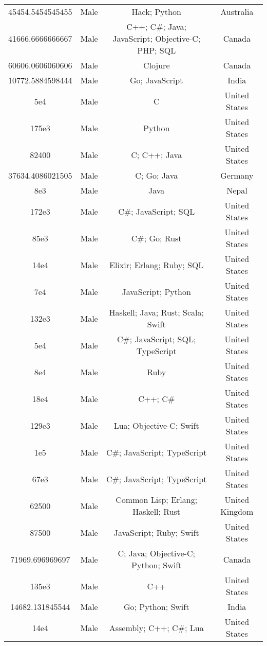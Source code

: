 \begin{center}
\begin{tabular}{ |c|c|c|c| }
45454.5454545455  &  Male  &  Hack; Python  &  Australia  \\ 
41666.6666666667  &  Male  &  C++; C\#; Java; JavaScript; Objective-C; PHP; SQL  &  Canada  \\ 
60606.0606060606  &  Male  &  Clojure  &  Canada  \\ 
10772.5884598444  &  Male  &  Go; JavaScript  &  India  \\ 
5e4  &  Male  &  C  &  United States  \\ 
175e3  &  Male  &  Python  &  United States  \\ 
82400  &  Male  &  C; C++; Java  &  United States  \\ 
37634.4086021505  &  Male  &  C; Go; Java  &  Germany  \\ 
8e3  &  Male  &  Java  &  Nepal  \\ 
172e3  &  Male  &  C\#; JavaScript; SQL  &  United States  \\ 
85e3  &  Male  &  C\#; Go; Rust  &  United States  \\ 
14e4  &  Male  &  Elixir; Erlang; Ruby; SQL  &  United States  \\ 
7e4  &  Male  &  JavaScript; Python  &  United States  \\ 
132e3  &  Male  &  Haskell; Java; Rust; Scala; Swift  &  United States  \\ 
5e4  &  Male  &  C\#; JavaScript; SQL; TypeScript  &  United States  \\ 
8e4  &  Male  &  Ruby  &  United States  \\ 
18e4  &  Male  &  C++; C\#  &  United States  \\ 
129e3  &  Male  &  Lua; Objective-C; Swift  &  United States  \\ 
1e5  &  Male  &  C\#; JavaScript; TypeScript  &  United States  \\ 
67e3  &  Male  &  C\#; JavaScript; TypeScript  &  United States  \\ 
62500  &  Male  &  Common Lisp; Erlang; Haskell; Rust  &  United Kingdom  \\ 
87500  &  Male  &  JavaScript; Ruby; Swift  &  United States  \\ 
71969.696969697  &  Male  &  C; Java; Objective-C; Python; Swift  &  Canada  \\ 
135e3  &  Male  &  C++  &  United States  \\ 
14682.131845544  &  Male  &  Go; Python; Swift  &  India  \\ 
14e4  &  Male  &  Assembly; C++; C\#; Lua  &  United States  \\ 

\end{tabular}
\end{center}
